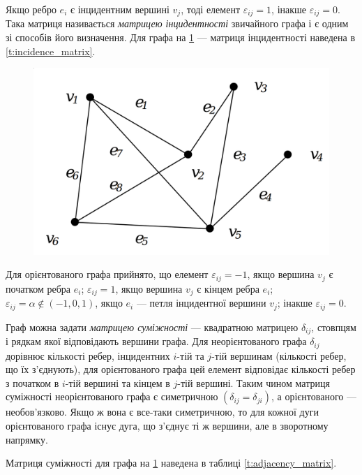 Якщо ребро $e_{i}$ є інцидентним вершині $v_{j}$, тоді елемент $\varepsilon_{ij} = 1$, інакше
$\varepsilon_{ij} = 0$.  Така матриця називається \emph{матрицею інцидентності} звичайного графа і є
одним зі способів його визначення. Для графа на \ref{f:sample_graph} --- матриця інцидентності
наведена в \ref{t:incidence_matrix}.

\begin{figure}[!ht]
  \centering
  \includegraphics[width=.75\textwidth]{images/lab3/sample_graph.png}
  \caption{}
  \label{f:sample_graph}
\end{figure}

Для орієнтованого графа прийнято, що елемент $\varepsilon_{ij} = -1$, якщо вершина $v_{j}$ є
початком ребра $e_{i}$; $\varepsilon_{ij} = 1$, якщо вершина $v_j$ є кінцем ребра $e_{i}$;
$\varepsilon_{ij} = \alpha \not\in (-1, 0, 1)$, якщо $e_{i}$ --- петля інцидентної вершини $v_j$;
інакше $\varepsilon_{ij} = 0$.

Граф можна задати \emph{матрицею суміжності} --- квадратною матрицею $\delta_{ij}$, стовпцям і
рядкам якої відповідають вершини графа. Для неорієнтованого графа $\delta_{ij}$ дорівнює кількості
ребер, інцидентних $i$-тій та $j$-тій вершинам (кількості ребер, що їх з'єднують), для орієнтованого
графа цей елемент відповідає кількості ребер з початком в $i$-тій вершині та кінцем в $j$-тій
вершині. Таким чином матриця суміжності неорієнтованого графа є симетричною
$(\delta_{ij} = \delta_{ji})$, а орієнтованого --- необов'язково. Якщо ж вона є все-таки
симетричною, то для кожної дуги орієнтованого графа існує дуга, що з'єднує ті ж вершини, але в
зворотному напрямку.

Матриця суміжності для графа на \ref{f:sample_graph} наведена в таблиці \ref{t:adjacency_matrix}.

